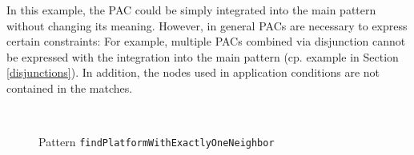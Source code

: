 In this example, the PAC could be simply integrated into the main pattern without changing its meaning.
However, in general PACs are necessary to express certain constraints:
For example, multiple PACs combined via disjunction cannot be expressed with the integration into the main pattern (cp. example in Section \ref{disjunctions}).
In addition, the nodes used in application conditions are not contained in the matches.

\begin{figure}[h!]
	\centering
	 \\
	\caption{Pattern \texttt{findPlatformWithExactlyOneNeighbor}}
	\label{fig:pattern-findPlatformWithExactlyOneNeighbor}
\end{figure}

